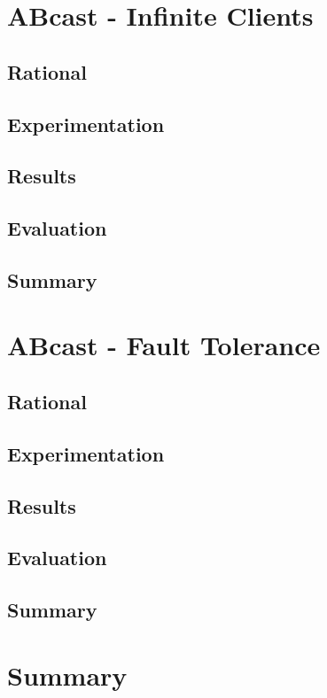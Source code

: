 \section{ABcast - Infinite Clients}
    \subsection{Rational}
    
    
    \subsection{Experimentation}
    
    \subsection{Results}
    
    \subsection{Evaluation}
    
    \subsection{Summary}

\section{ABcast - Fault Tolerance}
    \subsection{Rational}
    
    \subsection{Experimentation}
    
    \subsection{Results}
    
    \subsection{Evaluation}
    
    \subsection{Summary}
    
\section{Summary}